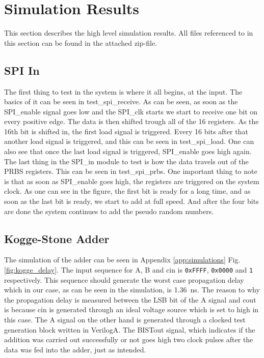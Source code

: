 \section{Simulation Results} \label{sec:simulation_results}
This section describes the high level simulation results. All files referenced to in this section can be found in the attached zip-file.
\subsection{SPI In}
The first thing to test in the system is where it all begins, at the input. The basics of it can be seen in test\_spi\_receive. As can be seen, as soon as the SPI\_enable signal goes low and the SPI\_clk starts we start to receive one bit on every positive edge. The data is then shifted trough all of the 16 registers. As the 16th bit is shifted in, the first load signal is triggered. Every 16 bits after that another load signal is triggered, and this can be seen in test\_spi\_load. One can also see that once the last load signal is triggered, SPI\_enable goes high again.\\
The last thing in the SPI\_in module to test is how the data travels out of the PRBS registers. This can be seen in test\_spi\_prbs. One important thing to note is that as soon as SPI\_enable goes high, the registers are triggered on the system clock. As one can see in the figure, the first bit is ready for a long time, and as soon as the last bit is ready, we start to add at full speed. And after the four bits are done the system continues to add the pseudo random numbers. 

\subsection{Kogge-Stone Adder}
The simulation of the adder can be seen in Appendix \ref{app:simulations} Fig. \ref{fig:kogge_delay}. The input sequence for A, B and cin is \texttt{0xFFFF}, \texttt{0x0000} and \texttt{1} respectively. This sequence should generate the worst case propagation delay which in our case, as can be seen in the simulation, is \SI{1.36}{\nano\s}. The reason to why the propagation delay is measured between the LSB bit of the A signal and cout is because cin is generated through an ideal voltage source which is set to high in this case. The A signal on the other hand is generated through a clocked test generation block written in VerilogA. The BISTout signal, which indicates if the addition was carried out successfully or not goes high two clock pulses after the data was fed into the adder, just as intended.

